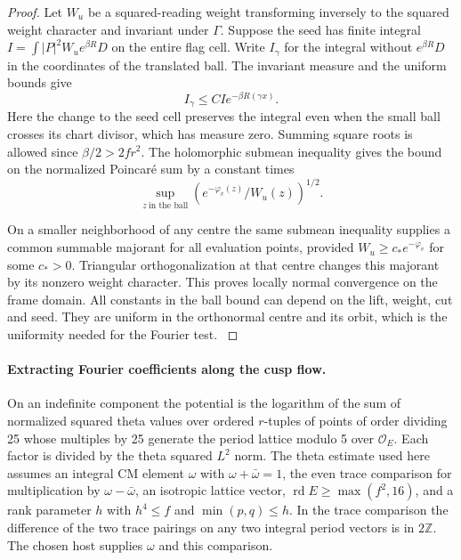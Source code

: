\begin{proof}
Let \(W_u\) be a squared-reading weight transforming
inversely to the squared weight character and invariant
under \(\Gamma\). Suppose the seed has finite integral
\(I=\int |P|^2 W_u e^{\beta R}D\) on the entire flag
cell. Write \(I_\gamma\) for the integral without
\(e^{\beta R}D\) in the coordinates of the translated
ball. The invariant measure and the uniform bounds
give 
\[
  I_\gamma\le C I e^{-\beta R(\gamma x)}.
\]
Here the change to the seed cell preserves the
integral even when the small ball crosses its chart
divisor, which has measure zero. Summing square roots
is allowed since \(\beta/2>2fr^2\).
The holomorphic submean inequality gives the bound on
the normalized Poincar\'e sum by a constant times
\[
       \sup_{z\ \text{in the ball}}
              \left(e^{-\varphi_v(z)}/W_u(z)\right)^{1/2}.
\]

On a smaller neighborhood of any centre the same
submean inequality supplies a common summable
majorant for all evaluation points, provided
\(W_u\ge c_*e^{-\varphi_v}\) for some \(c_*>0\).
Triangular orthogonalization at that centre changes
this majorant by its nonzero weight character. This
proves locally normal convergence on the frame domain.
All constants in the ball bound can depend on the
lift, weight, cut and seed. They are uniform in the
orthonormal centre and its orbit, which is the
uniformity needed for the Fourier test.
\label{cor:slice-short-analytic-3}

\end{proof}

\paragraph{Extracting Fourier coefficients along the cusp flow.}
On an indefinite component the potential is the
logarithm of the sum of normalized squared theta
values over ordered \(r\)-tuples of points of order
dividing 25 whose multiples by 25 generate the
period lattice modulo 5 over \(\mathcal O_E\).
Each factor is divided by the theta squared
\(L^2\) norm. The theta estimate used here assumes an
integral CM element \(\omega\) with
\(\omega+\bar\omega=1\), the even trace comparison for
multiplication by \(\omega-\bar\omega\), an isotropic
lattice vector, \(\operatorname{rd}E\ge\max(f^2,16)\),
and a rank parameter \(h\) with \(h^4\le f\) and
\(\min(p,q)\le h\). In the trace comparison the difference
of the two trace pairings on any two integral period
vectors is in \(2\mathbb Z\). The chosen host supplies
\(\omega\) and this comparison.

